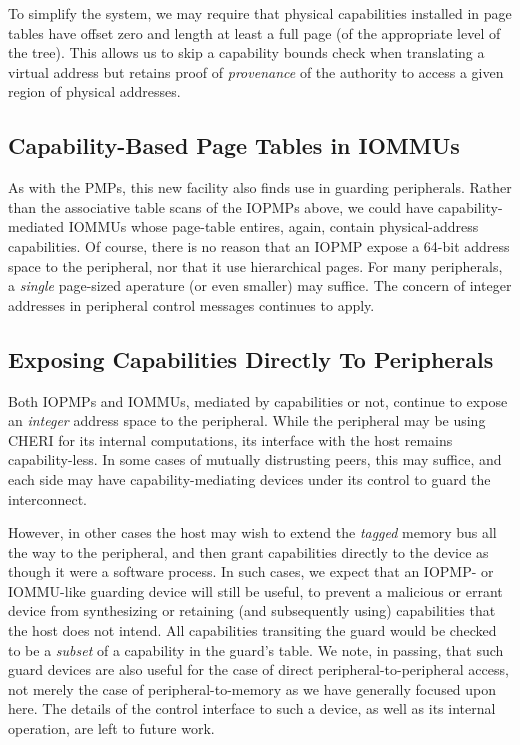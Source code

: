 To simplify the system, we may require that physical capabilities installed
in page tables have offset zero and length at least a full page (of the
appropriate level of the tree).  This allows us to skip a capability bounds
check when translating a virtual address but retains proof of
\emph{provenance} of the authority to access a given region of physical
addresses.

\subsection{Capability-Based Page Tables in IOMMUs} %

As with the PMPs, this new facility also finds use in guarding peripherals.
Rather than the associative table scans of the IOPMPs above, we could have
capability-mediated IOMMUs whose page-table entires, again, contain
physical-address capabilities.  Of course, there is no reason that an IOPMP
expose a 64-bit address space to the peripheral, nor that it use
hierarchical pages.  For many peripherals, a \emph{single} page-sized
aperature (or even smaller) may suffice.  The concern of integer addresses
in peripheral control messages continues to apply.

\subsection{Exposing Capabilities Directly To Peripherals} %

Both IOPMPs and IOMMUs, mediated by capabilities or not, continue to expose
an \emph{integer} address space to the peripheral.  While the peripheral may
be using CHERI for its internal computations, its interface with the host
remains capability-less.  In some cases of mutually distrusting peers, this
may suffice, and each side may have capability-mediating devices under its
control to guard the interconnect.

However, in other cases the host may wish to extend the \emph{tagged}
memory bus all the way to the peripheral, and then grant capabilities
directly to the device as though it were a software process.  In such cases,
we expect that an IOPMP- or IOMMU-like guarding device will still be useful,
to prevent a malicious or errant device from synthesizing or retaining (and
subsequently using) capabilities that the host does not intend.  All
capabilities transiting the guard would be checked to be a \emph{subset} of
a capability in the guard's table.  We note, in passing, that such guard
devices are also useful for the case of direct peripheral-to-peripheral
access, not merely the case of peripheral-to-memory as we have generally
focused upon here.  The details of the control interface to such a device,
as well as its internal operation, are left to future work.

